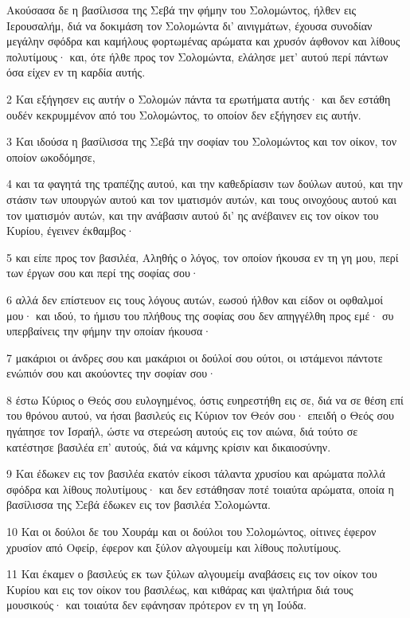 \par Ακούσασα δε η βασίλισσα της Σεβά την φήμην του Σολομώντος, ήλθεν εις Ιερουσαλήμ, διά να δοκιμάση τον Σολομώντα δι' αινιγμάτων, έχουσα συνοδίαν μεγάλην σφόδρα και καμήλους φορτωμένας αρώματα και χρυσόν άφθονον και λίθους πολυτίμους· και, ότε ήλθε προς τον Σολομώντα, ελάλησε μετ' αυτού περί πάντων όσα είχεν εν τη καρδία αυτής.
\par 2 Και εξήγησεν εις αυτήν ο Σολομών πάντα τα ερωτήματα αυτής· και δεν εστάθη ουδέν κεκρυμμένον από του Σολομώντος, το οποίον δεν εξήγησεν εις αυτήν.
\par 3 Και ιδούσα η βασίλισσα της Σεβά την σοφίαν του Σολομώντος και τον οίκον, τον οποίον ωκοδόμησε,
\par 4 και τα φαγητά της τραπέζης αυτού, και την καθεδρίασιν των δούλων αυτού, και την στάσιν των υπουργών αυτού και τον ιματισμόν αυτών, και τους οινοχόους αυτού και τον ιματισμόν αυτών, και την ανάβασιν αυτού δι' ης ανέβαινεν εις τον οίκον του Κυρίου, έγεινεν έκθαμβος·
\par 5 και είπε προς τον βασιλέα, Αληθής ο λόγος, τον οποίον ήκουσα εν τη γη μου, περί των έργων σου και περί της σοφίας σου·
\par 6 αλλά δεν επίστευον εις τους λόγους αυτών, εωσού ήλθον και είδον οι οφθαλμοί μου· και ιδού, το ήμισυ του πλήθους της σοφίας σου δεν απηγγέλθη προς εμέ· συ υπερβαίνεις την φήμην την οποίαν ήκουσα·
\par 7 μακάριοι οι άνδρες σου και μακάριοι οι δούλοί σου ούτοι, οι ιστάμενοι πάντοτε ενώπιόν σου και ακούοντες την σοφίαν σου·
\par 8 έστω Κύριος ο Θεός σου ευλογημένος, όστις ευηρεστήθη εις σε, διά να σε θέση επί του θρόνου αυτού, να ήσαι βασιλεύς εις Κύριον τον Θεόν σου· επειδή ο Θεός σου ηγάπησε τον Ισραήλ, ώστε να στερεώση αυτούς εις τον αιώνα, διά τούτο σε κατέστησε βασιλέα επ' αυτούς, διά να κάμνης κρίσιν και δικαιοσύνην.
\par 9 Και έδωκεν εις τον βασιλέα εκατόν είκοσι τάλαντα χρυσίου και αρώματα πολλά σφόδρα και λίθους πολυτίμους· και δεν εστάθησαν ποτέ τοιαύτα αρώματα, οποία η βασίλισσα της Σεβά έδωκεν εις τον βασιλέα Σολομώντα.
\par 10 Και οι δούλοι δε του Χουράμ και οι δούλοι του Σολομώντος, οίτινες έφερον χρυσίον από Οφείρ, έφερον και ξύλον αλγουμείμ και λίθους πολυτίμους.
\par 11 Και έκαμεν ο βασιλεύς εκ των ξύλων αλγουμείμ αναβάσεις εις τον οίκον του Κυρίου και εις τον οίκον του βασιλέως, και κιθάρας και ψαλτήρια διά τους μουσικούς· και τοιαύτα δεν εφάνησαν πρότερον εν τη γη Ιούδα.
